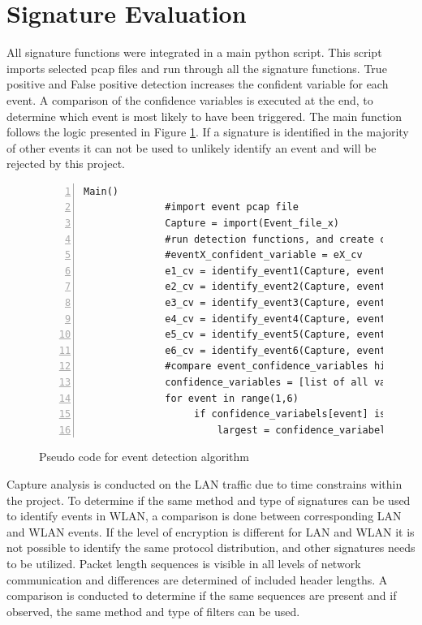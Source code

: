 \section{Signature Evaluation}
All signature functions were integrated in a main python script. This script imports selected pcap files and run through all the signature functions. True positive and False positive detection increases the confident variable for each event. A comparison of the confidence variables is executed at the end, to determine which event is most likely to have been triggered. The main function follows the logic presented in Figure \ref{fig:Sudo_code_event_detection_alg}. If a signature is identified in the majority of other events it can not be used to unlikely identify an event and will be rejected by this project. 

\begin{figure}[H]
    \centering
    \caption{Pseudo code for event detection algorithm}
    \label{fig:Sudo_code_event_detection_alg}
    \begin{lstlisting}[numbers=left]
         Main()
              #import event pcap file
              Capture = import(Event_file_x)
              #run detection functions, and create confidence variables
              #eventX_confident_variable = eX_cv  
              e1_cv = identify_event1(Capture, event1_confidence_variable)
              e2_cv = identify_event2(Capture, event1_confidence_variable)
              e3_cv = identify_event3(Capture, event1_confidence_variable)
              e4_cv = identify_event4(Capture, event1_confidence_variable)
              e5_cv = identify_event5(Capture, event1_confidence_variable)
              e6_cv = identify_event6(Capture, event1_confidence_variable)
              #compare event_confidence_variables highest is event
              confidence_variables = [list of all variables]
              for event in range(1,6)
                   if confidence_variabels[event] is larger than last number
                       largest = confidence_variabels[event]  
    \end{lstlisting}
\end{figure}

Capture analysis is conducted on the \gls{LAN} traffic due to time constrains within the project. To determine if the same method and type of signatures can be used to identify events in \gls{WLAN}, a comparison is done between corresponding \gls{LAN} and \gls{WLAN} events. If the level of encryption is different for \gls{LAN} and \gls{WLAN} it is not possible to identify the same protocol distribution, and other signatures needs to be utilized. Packet length sequences is visible in all levels of network communication and differences are determined of included header lengths. A comparison is conducted to determine if the same sequences are present and if observed, the same method and type of filters can be used. 

